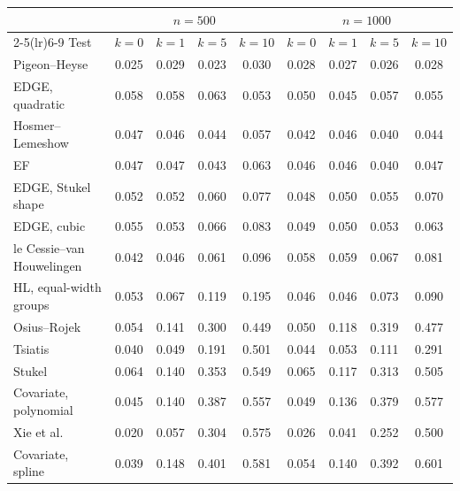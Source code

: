 \begin{tabular}{lcccccccc}
\toprule
 & \multicolumn{4}{c}{$n=500$} & \multicolumn{4}{c}{$n=1000$} \\
\cmidrule(lr){2-5}\cmidrule(lr){6-9}
Test & $k=0$ & $k=1$ & $k=5$ & $k=10$ & $k=0$ & $k=1$ & $k=5$ & $k=10$ \\
\midrule
Pigeon--Heyse & 0.025 & 0.029 & 0.023 & 0.030 & 0.028 & 0.027 & 0.026 & 0.028 \\
EDGE, quadratic & 0.058 & 0.058 & 0.063 & 0.053 & 0.050 & 0.045 & 0.057 & 0.055 \\
Hosmer--Lemeshow & 0.047 & 0.046 & 0.044 & 0.057 & 0.042 & 0.046 & 0.040 & 0.044 \\
EF & 0.047 & 0.047 & 0.043 & 0.063 & 0.046 & 0.046 & 0.040 & 0.047 \\
EDGE, Stukel shape & 0.052 & 0.052 & 0.060 & 0.077 & 0.048 & 0.050 & 0.055 & 0.070 \\
EDGE, cubic & 0.055 & 0.053 & 0.066 & 0.083 & 0.049 & 0.050 & 0.053 & 0.063 \\
le Cessie--van Houwelingen & 0.042 & 0.046 & 0.061 & 0.096 & 0.058 & 0.059 & 0.067 & 0.081 \\
HL, equal-width groups & 0.053 & 0.067 & 0.119 & 0.195 & 0.046 & 0.046 & 0.073 & 0.090 \\
Osius--Rojek & 0.054 & 0.141 & 0.300 & 0.449 & 0.050 & 0.118 & 0.319 & 0.477 \\
Tsiatis & 0.040 & 0.049 & 0.191 & 0.501 & 0.044 & 0.053 & 0.111 & 0.291 \\
Stukel & 0.064 & 0.140 & 0.353 & 0.549 & 0.065 & 0.117 & 0.313 & 0.505 \\
Covariate, polynomial & 0.045 & 0.140 & 0.387 & 0.557 & 0.049 & 0.136 & 0.379 & 0.577 \\
Xie et al. & 0.020 & 0.057 & 0.304 & 0.575 & 0.026 & 0.041 & 0.252 & 0.500 \\
Covariate, spline & 0.039 & 0.148 & 0.401 & 0.581 & 0.054 & 0.140 & 0.392 & 0.601 \\
\bottomrule
\end{tabular}